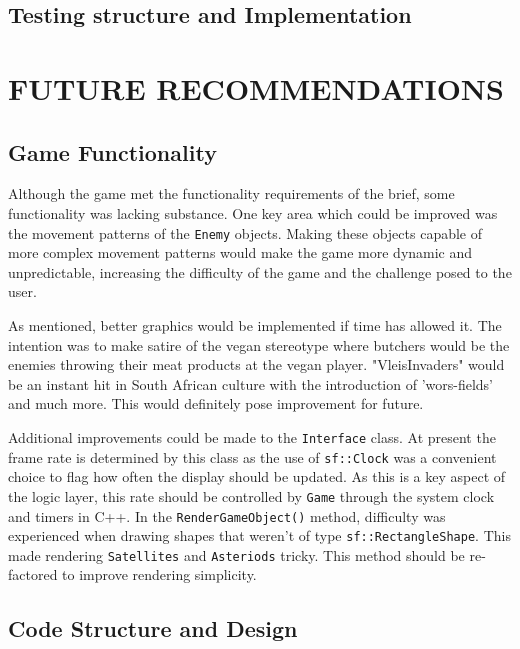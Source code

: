 \documentclass[10pt,twocolumn]{witseiepaper}
\begin{document}
\subsection{Testing structure and Implementation}

\section{FUTURE RECOMMENDATIONS}

\subsection{Game Functionality}

Although the game met the functionality requirements of the brief, some functionality was lacking substance. One key area which could be improved was the movement patterns of the \texttt{Enemy} objects. Making these objects capable of more complex movement patterns would make the game more dynamic and unpredictable, increasing the difficulty of the game and the challenge posed to the user.

As mentioned, better graphics would be implemented if time has allowed it. The intention was to make satire of the vegan stereotype where butchers would be the enemies throwing their meat products at the vegan player. "VleisInvaders" would be an instant hit in South African culture with the introduction of 'wors-fields' and much more. This would definitely pose improvement for future.

Additional improvements could be made to the \texttt{Interface} class. At present the frame rate is determined by this class as the use of \texttt{sf::Clock} was a convenient choice to flag how often the display should be updated. As this is a key aspect of the logic layer, this rate should be controlled by \texttt{Game} through the system clock and timers in C++. In the \texttt{RenderGameObject()} method, difficulty was experienced when drawing shapes that weren't of type \texttt{sf::RectangleShape}. This made rendering \texttt{Satellites} and \texttt{Asteriods} tricky. This method should be re-factored to improve rendering simplicity.

\subsection{Code Structure and Design}\label{code_improvements}
\end{document}
